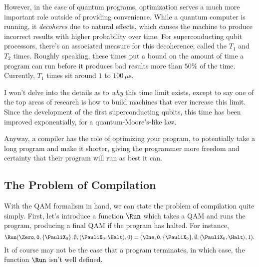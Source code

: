 However, in the case of quantum programs, optimization serves a much more important role outside of providing convenience. While a quantum computer is running, it \emph{decoheres} due to natural effects, which causes the machine to produce incorrect results with higher probability over time. For superconducting qubit processors, there's an associated measure for this decoherence, called the $T_1$ and $T_2$ times. Roughly speaking, these times put a bound on the amount of time a program can run before it produces bad results more than $50\%$ of the time. Currently, $T_1$ times sit around $1$ to $100\,\mu\mathrm{s}$.

I won't delve into the details as to \emph{why} this time limit exists, except to say one of the top areas of research is how to build machines that ever increase this limit. Since the development of the first superconducting qubits, this time has been improved exponentially, for a quantum-Moore's-like law.

Anyway, a compiler has the role of optimizing your program, to potentially take a long program and make it shorter, giving the programmer more freedom and certainty that their program will run as best it can.

\subsection{The Problem of Compilation}

With the QAM formalism in hand, we can state the problem of compilation quite simply. First, let's introduce a function $\Run$ which takes a QAM and runs the program, producing a final QAM if the program has halted. For instance,
\begin{displaymath}
\Run (\Zero, \mathtt{0}, \{\PauliX_0\}, \emptyset, \langle \PauliX_0, \Halt\rangle, 0)
=
(\One, \mathtt{0}, \{\PauliX_0\}, \emptyset, \langle \PauliX_0,\Halt\rangle, 1).
\end{displaymath}
It of course may not be the case that a program terminates, in which case, the function $\Run$ isn't well defined.

